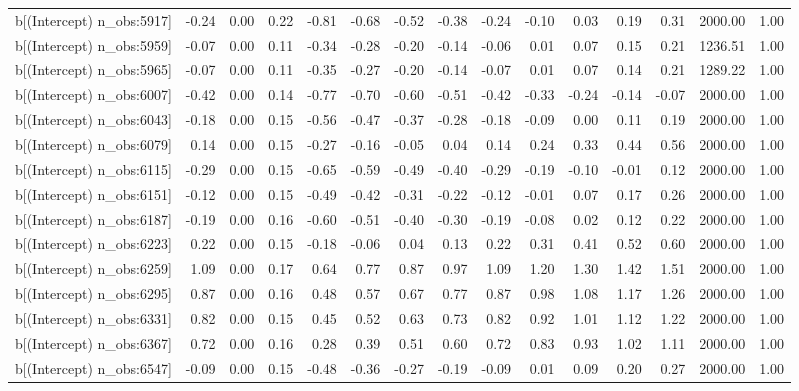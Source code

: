 \begin{table}[ht]
\begin{tabular}{rrrrrrrrrrrrrrr}
  b[(Intercept) n\_obs:5917] & -0.24 & 0.00 & 0.22 & -0.81 & -0.68 & -0.52 & -0.38 & -0.24 & -0.10 & 0.03 & 0.19 & 0.31 & 2000.00 & 1.00 \\ 
  b[(Intercept) n\_obs:5959] & -0.07 & 0.00 & 0.11 & -0.34 & -0.28 & -0.20 & -0.14 & -0.06 & 0.01 & 0.07 & 0.15 & 0.21 & 1236.51 & 1.00 \\ 
  b[(Intercept) n\_obs:5965] & -0.07 & 0.00 & 0.11 & -0.35 & -0.27 & -0.20 & -0.14 & -0.07 & 0.01 & 0.07 & 0.14 & 0.21 & 1289.22 & 1.00 \\ 
  b[(Intercept) n\_obs:6007] & -0.42 & 0.00 & 0.14 & -0.77 & -0.70 & -0.60 & -0.51 & -0.42 & -0.33 & -0.24 & -0.14 & -0.07 & 2000.00 & 1.00 \\ 
  b[(Intercept) n\_obs:6043] & -0.18 & 0.00 & 0.15 & -0.56 & -0.47 & -0.37 & -0.28 & -0.18 & -0.09 & 0.00 & 0.11 & 0.19 & 2000.00 & 1.00 \\ 
  b[(Intercept) n\_obs:6079] & 0.14 & 0.00 & 0.15 & -0.27 & -0.16 & -0.05 & 0.04 & 0.14 & 0.24 & 0.33 & 0.44 & 0.56 & 2000.00 & 1.00 \\ 
  b[(Intercept) n\_obs:6115] & -0.29 & 0.00 & 0.15 & -0.65 & -0.59 & -0.49 & -0.40 & -0.29 & -0.19 & -0.10 & -0.01 & 0.12 & 2000.00 & 1.00 \\ 
  b[(Intercept) n\_obs:6151] & -0.12 & 0.00 & 0.15 & -0.49 & -0.42 & -0.31 & -0.22 & -0.12 & -0.01 & 0.07 & 0.17 & 0.26 & 2000.00 & 1.00 \\ 
  b[(Intercept) n\_obs:6187] & -0.19 & 0.00 & 0.16 & -0.60 & -0.51 & -0.40 & -0.30 & -0.19 & -0.08 & 0.02 & 0.12 & 0.22 & 2000.00 & 1.00 \\ 
  b[(Intercept) n\_obs:6223] & 0.22 & 0.00 & 0.15 & -0.18 & -0.06 & 0.04 & 0.13 & 0.22 & 0.31 & 0.41 & 0.52 & 0.60 & 2000.00 & 1.00 \\ 
  b[(Intercept) n\_obs:6259] & 1.09 & 0.00 & 0.17 & 0.64 & 0.77 & 0.87 & 0.97 & 1.09 & 1.20 & 1.30 & 1.42 & 1.51 & 2000.00 & 1.00 \\ 
  b[(Intercept) n\_obs:6295] & 0.87 & 0.00 & 0.16 & 0.48 & 0.57 & 0.67 & 0.77 & 0.87 & 0.98 & 1.08 & 1.17 & 1.26 & 2000.00 & 1.00 \\ 
  b[(Intercept) n\_obs:6331] & 0.82 & 0.00 & 0.15 & 0.45 & 0.52 & 0.63 & 0.73 & 0.82 & 0.92 & 1.01 & 1.12 & 1.22 & 2000.00 & 1.00 \\ 
  b[(Intercept) n\_obs:6367] & 0.72 & 0.00 & 0.16 & 0.28 & 0.39 & 0.51 & 0.60 & 0.72 & 0.83 & 0.93 & 1.02 & 1.11 & 2000.00 & 1.00 \\ 
  b[(Intercept) n\_obs:6547] & -0.09 & 0.00 & 0.15 & -0.48 & -0.36 & -0.27 & -0.19 & -0.09 & 0.01 & 0.09 & 0.20 & 0.27 & 2000.00 & 1.00 \\ 

\end{tabular}
\end{table}
